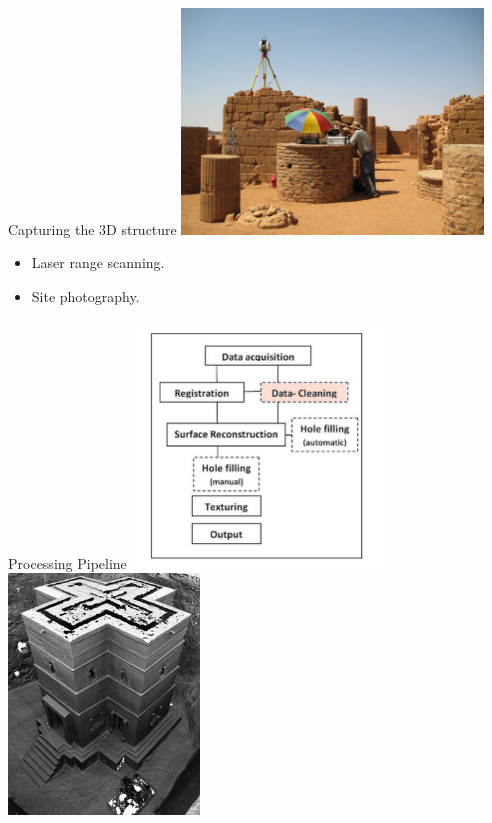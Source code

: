 \documentclass{beamer}
\begin{document}
\begin{frame}{Capturing the 3D structure}
  \includegraphics[width=0.60\textwidth]{pics/scanning.jpg}
    \begin{itemize}
  \item
    Laser range scanning.
  \item
    Site photography.
  \end{itemize}
\end{frame}

\begin{frame}{Processing Pipeline}
  \includegraphics[width=0.50\textwidth]{pics/pipeline.png}
  \includegraphics[width=0.38\textwidth]{pics/zamani2.jpg}
\end{frame}
\end{document}
